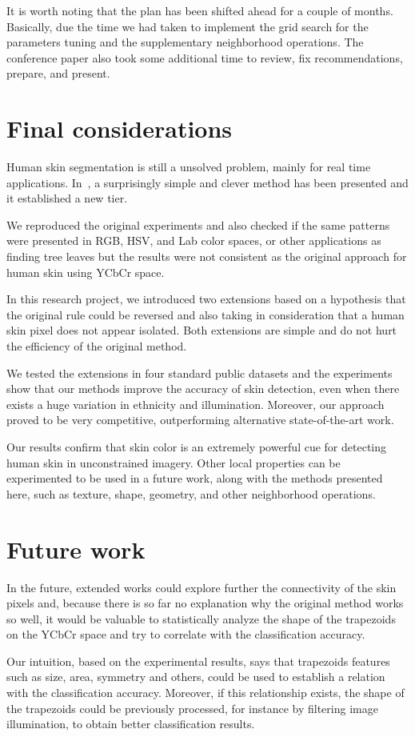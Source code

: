 It is worth noting that the plan has been shifted ahead for a couple of months. Basically, due the time we had taken to implement the grid search for the parameters tuning and the supplementary neighborhood operations. The conference paper also took some additional time to review, fix recommendations, prepare, and present.


\section{Final considerations}
\label{sec:final_considerations}
Human skin segmentation is still a unsolved problem, mainly for real time applications. In~\cite{brancati:17}, a surprisingly simple and clever method has been presented and it established a new tier.

We reproduced the original experiments and also checked if the same patterns were presented in RGB, HSV, and Lab color spaces, or other applications as finding tree leaves but the results were not consistent as the original approach for human skin using YCbCr space.

In this research project, we introduced two extensions based on a hypothesis that the original rule could be reversed and also taking in consideration that a human skin pixel does not appear isolated. Both extensions are simple and do not hurt the efficiency of the original method.

We tested the extensions in four standard public datasets and the experiments show that our methods improve the accuracy of skin detection, even when there exists a huge variation in ethnicity and illumination. Moreover, our approach proved to be very competitive, outperforming alternative state-of-the-art work.

Our results confirm that skin color is an extremely powerful cue for detecting human skin in unconstrained imagery. Other local properties can be experimented to be used in a future work, along with the methods presented here, such as texture, shape, geometry, and other neighborhood operations.


\section{Future work}
\label{sec:future_work}

In the future, extended works could explore further the connectivity of the skin pixels and, because there is so far no explanation why the original method works so well, it would be valuable to statistically analyze the shape of the trapezoids on the YCbCr space and try to correlate with the classification accuracy.

Our intuition, based on the experimental results, says that trapezoids features such as size, area, symmetry and others, could be used to establish a relation with the classification accuracy. Moreover, if  this relationship exists, the shape of the trapezoids could be previously processed, for instance by filtering image illumination, to obtain better classification results.